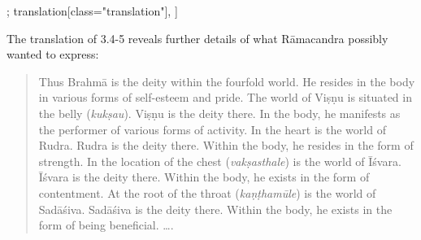 \begin{alignment}[
  texts=edition[class="edition"];
  translation[class="translation"],
  ]
\begin{translation}
\begin{tlate}
{The translation of  3.4-5 reveals further details of what Rāmacandra possibly wanted to express:
\begin{quote}
  Thus Brahmā is the deity within the fourfold world. He resides in the body in various forms of self-esteem and pride. The world of Viṣṇu is situated in the belly (\textit{kukṣau}). Viṣṇu is the deity there. In the body, he manifests as the performer of various forms of activity. In the heart is the world of Rudra. Rudra is the deity there. Within the body, he resides in the form of strength. In the location of the chest (\textit{vakṣasthale}) is the world of Īśvara. Īśvara is the deity there. Within the body, he exists in the form of contentment. At the root of the throat (\textit{kaṇṭhamūle}) is the world of Sadāśiva. Sadāśiva is the deity there. Within the body, he exists in the form of being beneficial. \ldots.
\end{quote}}
\clearpage
   \end{tlate}
  \end{translation}
\end{alignment}
\pagebreak %
